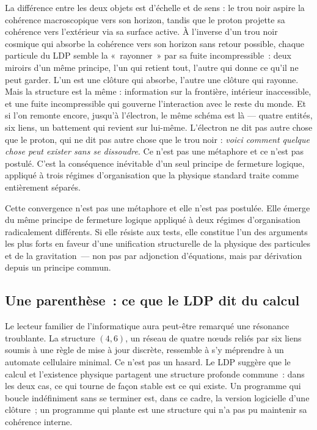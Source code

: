 \documentclass[12pt, a4paper, openright]{book}
\begin{document}
La différence entre les deux objets est d'échelle et de sens : le trou noir aspire la cohérence macroscopique vers son horizon, tandis que le proton projette sa cohérence vers l'extérieur via sa surface active. À l'inverse d'un trou noir cosmique qui absorbe la cohérence vers son horizon sans retour possible, chaque particule du LDP semble la «~rayonner~» par sa fuite incompressible~: deux miroirs d'un même principe, l'un qui retient tout, l'autre qui donne ce qu'il ne peut garder. L'un est une clôture qui absorbe, l'autre une clôture qui rayonne. Mais la structure est la même : information sur la frontière, intérieur inaccessible, et une fuite incompressible qui gouverne l'interaction avec le reste du monde. Et si l'on remonte encore, jusqu'à l'électron, le même schéma est là --- quatre entités, six liens, un battement qui revient sur lui-même. L'électron ne dit pas autre chose que le proton, qui ne dit pas autre chose que le trou noir : \emph{voici comment quelque chose peut exister sans se dissoudre}. Ce n'est pas une métaphore et ce n'est pas postulé. C'est la conséquence inévitable d'un seul principe de fermeture logique, appliqué à trois régimes d'organisation que la physique standard traite comme entièrement séparés.

\medskip

Cette convergence n'est pas une métaphore et elle n'est pas postulée. Elle émerge du même principe de fermeture logique appliqué à deux régimes d'organisation radicalement différents. Si elle résiste aux tests, elle constitue l'un des arguments les plus forts en faveur d'une unification structurelle de la physique des particules et de la gravitation~--- non pas par adjonction d'équations, mais par dérivation depuis un principe commun.

\subsection*{Une parenthèse~: ce que le LDP dit du calcul}

Le lecteur familier de l'informatique aura peut-être remarqué une résonance troublante. La structure $(4,6)$, un réseau de quatre n\oe{}uds reliés par six liens soumis à une règle de mise à jour discrète, ressemble à s'y méprendre à un automate cellulaire minimal. Ce n'est pas un hasard. Le LDP suggère que le calcul et l'existence physique partagent une structure profonde commune~: dans les deux cas, ce qui \og tourne\fg{} de façon stable est ce qui \og existe\fg{}. Un programme qui boucle indéfiniment sans se terminer est, dans ce cadre, la version logicielle d'une clôture~; un programme qui plante est une structure qui n'a pas pu maintenir sa cohérence interne.
\end{document}
